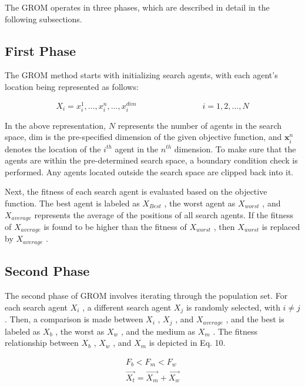 The GROM operates in three phases, which are described in detail in the following subsections.

\subsection{First Phase}

The GROM method starts with initializing search agents, with each agent’s location being represented as follows:

\begin{equation}
X_{i}=x_{i}^{1},...,x_{i}^{n},...,x_{i}^{d i m}\quad\quad\quad\quad\quad\quad\quad\quad i=1,2,...,N_{}
\end{equation}

In the above representation, $N$ represents the number of agents in the search space, dim is the pre-specified dimension of the given objective function, and $\boldsymbol{x}_{i}^{n}$ denotes the location of the $i^{t h}$ agent in the $n^{t h}$ dimension. To make sure that the agents are within the pre-determined search space, a boundary condition check is performed. Any agents located outside the search space are clipped back into it.

Next, the fitness of each search agent is evaluated based on the objective function. The best agent is labeled as $X_{B e s t}$ , the worst agent as $X_{w o r s t}$ , and $X_{a v e r a g e}$ represents the average of the positions of all search agents. If the fitness of $X_{a v e r a g e}$ is found to be higher than the fitness of $X_{w o r s t}$ , then $X_{w o r s t}$ is replaced by $X_{a v e r a g e}$ .

\subsection{Second Phase}

The second phase of GROM involves iterating through the population set. For each search agent $X_{i}$ , a different search agent $X_{j}$ is randomly selected, with $i\neq j$ . Then, a comparison is made between $X_{i}$ , $X_{j}$ , and $X_{a v e r a g e}$ , and the best is labeled as $X_{b}$ , the worst as $X_{w}$ , and the medium as $X_{m}$ . The fitness relationship between $X_{b}$ , $X_{w}$ , and $X_{m}$ is depicted in Eq. 10.

\begin{equation}
\begin{array}{l}{{F_{b}<F_{m}<F_{w}}}\\ {{\displaystyle\overrightarrow{X_{t}}=\overrightarrow{X_{m}}+\overrightarrow{X_{w}}}}\end{array}
\end{equation}

